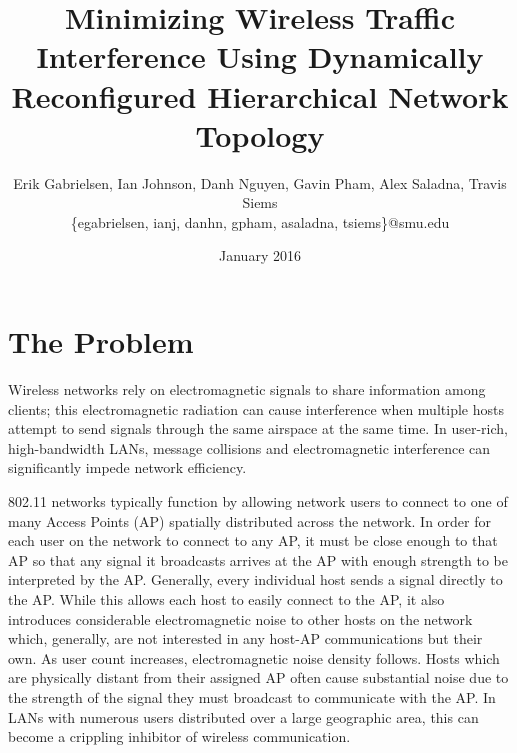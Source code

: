 \documentclass{sigcomm-alternate}
\title{Minimizing Wireless Traffic Interference Using Dynamically Reconfigured Hierarchical Network Topology}
\author{Erik Gabrielsen, Ian Johnson, Danh Nguyen, Gavin Pham, Alex Saladna, Travis Siems\\ \{egabrielsen, ianj, danhn, gpham, asaladna, tsiems\}@smu.edu}
\date{January 2016}
\begin{document}
\maketitle

\section{The Problem}
Wireless networks rely on electromagnetic signals to share information among clients; this electromagnetic radiation can cause interference when multiple hosts attempt to send signals through the same airspace at the same time. In user-rich, high-bandwidth LANs, message collisions and electromagnetic interference can significantly impede network efficiency.

802.11 networks typically function by allowing network users to connect to one of many Access Points (AP) spatially distributed across the network. In order for each user on the network to connect to any AP, it must be close enough to that AP so that any signal it broadcasts arrives at the AP with enough strength to be interpreted by the AP. Generally, every individual host sends a signal directly to the AP. While this allows each host to easily connect to the AP, it also introduces considerable electromagnetic noise to other hosts on the network which, generally, are not interested in any host-AP communications but their own. As user count increases, electromagnetic noise density follows. Hosts which are physically distant from their assigned AP often cause substantial noise due to the strength of the signal they must broadcast to communicate with the AP. In LANs with numerous users distributed over a large geographic area, this can become a crippling inhibitor of wireless communication.
\end{document}
